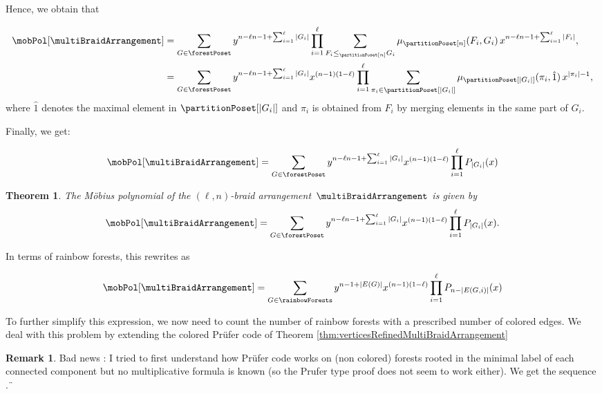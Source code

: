 \documentclass[11pt,leqno]{amsart}
\newcommand{\OEIS}[1]{\cite[{\rm \href{http://oeis.org/#1}{\texttt{#1}}}]{OEIS}}
\theoremstyle{definition}
\newtheorem{remark}[definition]{Remark}
\theoremstyle{plain}
\newtheorem{theorem}[definition]{Theorem}
\begin{document}
Hence, we obtain that

\begin{align*}
\mobPol[\multiBraidArrangement] &=\sum_{G \in \forestPoset} y^{n-\ell n - 1 + \sum_{i=1}^\ell |G_i|} \prod_{i=1}^{\ell} \sum_{F_i \leq_{\partitionPoset[n]} G_i } \mu_{\partitionPoset[n]}(F_i,G_i) \, x^{n-\ell n - 1 + \sum_{i=1}^\ell |F_i|}, \\
 &=\sum_{G \in \forestPoset} y^{n-\ell n - 1 + \sum_{i=1}^\ell |G_i|} x^{(n-1)(1-\ell)} \prod_{i=1}^{\ell} \sum_{\pi_i \in \partitionPoset[|G_i|]}  \mu_{\partitionPoset[|G_i|]}(\pi_i,\hat{1}) \, x^{|\pi_i|-1}, 
\end{align*}
where $\hat{1}$ denotes the maximal element in $\partitionPoset[|G_i|]$ and $\pi_i$ is obtained from $F_i$ by merging elements in the same part of $G_i$.

Finally, we get:

\begin{equation}
\mobPol[\multiBraidArrangement]=\sum_{G \in \forestPoset} y^{n-\ell n - 1 + \sum_{i=1}^\ell |G_i|} x^{(n-1)(1-\ell)} \prod_{i=1}^{\ell} P_{|G_i|}(x)
\end{equation}

\begin{theorem}
The M\"obius polynomial of the $(\ell,n)$-braid arrangement~$\multiBraidArrangement$ is given by
\[
\mobPol[\multiBraidArrangement]=\sum_{G \in \forestPoset} y^{n-\ell n - 1 + \sum_{i=1}^\ell |G_i|} x^{(n-1)(1-\ell)} \prod_{i=1}^{\ell} P_{|G_i|}(x).
\]
\end{theorem}

In terms of rainbow forests, this rewrites as

\begin{equation}
\mobPol[\multiBraidArrangement]=\sum_{G \in \rainbowForests} y^{n- 1 + |E(G)|} x^{(n-1)(1-\ell)} \prod_{i=1}^{\ell} P_{n-|E(G,i)|}(x)
\end{equation}

To further simplify this expression, we now need to count the number of rainbow forests with a prescribed number of colored edges. We deal with this problem by extending the colored Pr\"{u}fer code of Theorem \ref{thm:verticesRefinedMultiBraidArrangement}


\begin{remark}
Bad news : I tried to first understand  how Pr\"{u}fer code works on (non colored) forests rooted in the minimal label of each connected component but no multiplicative formula is known (so the Prufer type proof does not seem to work either).
We get the sequence \OEIS{A138464}.¨
\end{remark}





\label{sec:biblio}
\end{document}
